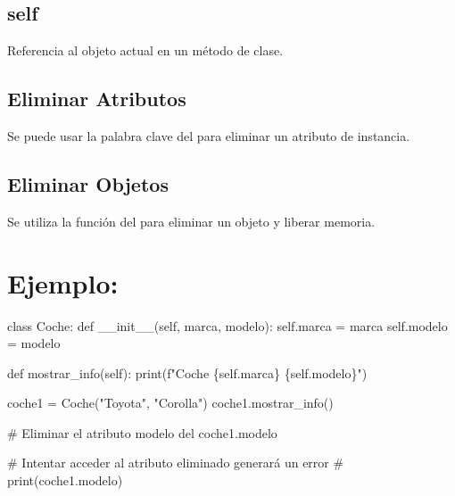 \documentclass[
  a4paper,
  onepage,
  openany]{scrreprt}
\newenvironment{Shaded}{\begin{snugshade}}{\end{snugshade}}
\newcommand{\BuiltInTok}[1]{\textcolor[rgb]{0.00,0.23,0.31}{#1}}
\newcommand{\CommentTok}[1]{\textcolor[rgb]{0.37,0.37,0.37}{#1}}
\newcommand{\FunctionTok}[1]{\textcolor[rgb]{0.28,0.35,0.67}{#1}}
\newcommand{\KeywordTok}[1]{\textcolor[rgb]{0.00,0.23,0.31}{#1}}
\newcommand{\NormalTok}[1]{\textcolor[rgb]{0.00,0.23,0.31}{#1}}
\newcommand{\OperatorTok}[1]{\textcolor[rgb]{0.37,0.37,0.37}{#1}}
\newcommand{\SpecialCharTok}[1]{\textcolor[rgb]{0.37,0.37,0.37}{#1}}
\newcommand{\SpecialStringTok}[1]{\textcolor[rgb]{0.13,0.47,0.30}{#1}}
\newcommand{\StringTok}[1]{\textcolor[rgb]{0.13,0.47,0.30}{#1}}
\newcommand{\VariableTok}[1]{\textcolor[rgb]{0.07,0.07,0.07}{#1}}
\begin{document}
\hypertarget{self-1}{%
\subsection{self}\label{self-1}}

Referencia al objeto actual en un método de clase.

\hypertarget{eliminar-atributos-1}{%
\subsection{Eliminar Atributos}\label{eliminar-atributos-1}}

Se puede usar la palabra clave del para eliminar un atributo de
instancia.

\hypertarget{eliminar-objetos-1}{%
\subsection{Eliminar Objetos}\label{eliminar-objetos-1}}

Se utiliza la función del para eliminar un objeto y liberar memoria.

\hypertarget{ejemplo-55}{%
\section{Ejemplo:}\label{ejemplo-55}}

\begin{Shaded}
\begin{Highlighting}[]
\KeywordTok{class}\NormalTok{ Coche:}
    \KeywordTok{def} \FunctionTok{\_\_init\_\_}\NormalTok{(}\VariableTok{self}\NormalTok{, marca, modelo):}
        \VariableTok{self}\NormalTok{.marca }\OperatorTok{=}\NormalTok{ marca}
        \VariableTok{self}\NormalTok{.modelo }\OperatorTok{=}\NormalTok{ modelo}

    \KeywordTok{def}\NormalTok{ mostrar\_info(}\VariableTok{self}\NormalTok{):}
        \BuiltInTok{print}\NormalTok{(}\SpecialStringTok{f"Coche }\SpecialCharTok{\{}\VariableTok{self}\SpecialCharTok{.}\NormalTok{marca}\SpecialCharTok{\}}\SpecialStringTok{ }\SpecialCharTok{\{}\VariableTok{self}\SpecialCharTok{.}\NormalTok{modelo}\SpecialCharTok{\}}\SpecialStringTok{"}\NormalTok{)}

\NormalTok{coche1 }\OperatorTok{=}\NormalTok{ Coche(}\StringTok{"Toyota"}\NormalTok{, }\StringTok{"Corolla"}\NormalTok{)}
\NormalTok{coche1.mostrar\_info()}

\CommentTok{\# Eliminar el atributo \textquotesingle{}modelo\textquotesingle{}}
\KeywordTok{del}\NormalTok{ coche1.modelo}

\CommentTok{\# Intentar acceder al atributo eliminado generará un error}
\CommentTok{\# print(coche1.modelo)}
\end{Highlighting}
\end{Shaded}
\end{document}
